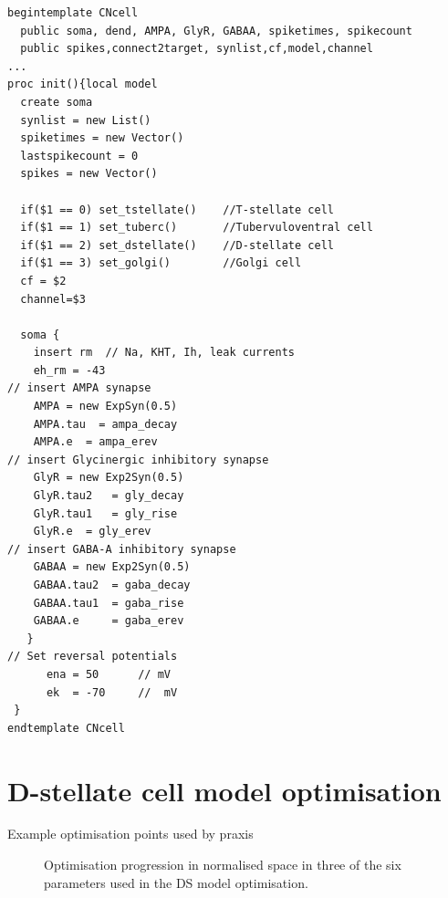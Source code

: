 \begin{lstlisting}[label=lst:CellTemplate,caption=Rothman and Manis cochlear
  nucleus cell template (in CNcell.tem)]
begintemplate CNcell
  public soma, dend, AMPA, GlyR, GABAA, spiketimes, spikecount
  public spikes,connect2target, synlist,cf,model,channel
...
proc init(){local model
  create soma
  synlist = new List()
  spiketimes = new Vector()
  lastspikecount = 0
  spikes = new Vector()
    
  if($1 == 0) set_tstellate()    //T-stellate cell
  if($1 == 1) set_tuberc()       //Tubervuloventral cell
  if($1 == 2) set_dstellate()    //D-stellate cell
  if($1 == 3) set_golgi()        //Golgi cell
  cf = $2
  channel=$3

  soma {
    insert rm  // Na, KHT, Ih, leak currents 
    eh_rm = -43 
// insert AMPA synapse 
    AMPA = new ExpSyn(0.5)
    AMPA.tau  = ampa_decay
    AMPA.e 	= ampa_erev
// insert Glycinergic inhibitory synapse 
    GlyR = new Exp2Syn(0.5)
    GlyR.tau2	= gly_decay
    GlyR.tau1	= gly_rise
    GlyR.e 	= gly_erev
// insert GABA-A inhibitory synapse 
    GABAA = new Exp2Syn(0.5)
    GABAA.tau2 	= gaba_decay
    GABAA.tau1 	= gaba_rise
    GABAA.e 	= gaba_erev
   }
// Set reversal potentials 
      ena = 50		// mV
      ek  = -70		//  mV
 }
endtemplate CNcell 

\end{lstlisting}

\section{D-stellate cell model optimisation}

Example optimisation points used by praxis 
\begin{figure}[htb]
\centering
{}
 \caption{Optimisation progression in normalised space in three of the six parameters used in the DS model optimisation.} \label{fig:DShandtuned}
 \end{figure}






